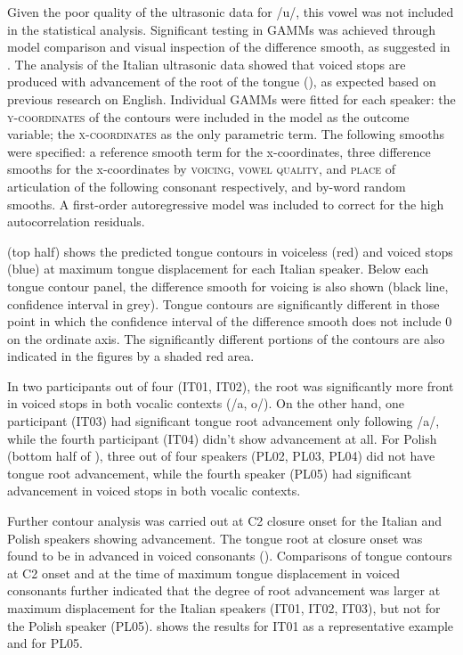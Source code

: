 \documentclass[authoryear, twocolumn]{elsarticle}
\begin{document}
Given the poor quality of the ultrasonic data for /u/, this vowel was
not included in the statistical analysis. Significant testing in GAMMs
was achieved through model comparison and visual inspection of the
difference smooth, as suggested in \citep{soskuthy2017}. The analysis of
the Italian ultrasonic data showed that voiced stops are produced with
advancement of the root of the tongue (), as expected based on previous
research on English. Individual GAMMs were fitted for each speaker: the
\textsc{y-coordinates} of the contours were included in the model as the
outcome variable; the \textsc{x-coordinates} as the only parametric
term. The following smooths were specified: a reference smooth term for
the x-coordinates, three difference smooths for the x-coordinates by
\textsc{voicing}, \textsc{vowel quality}, and \textsc{place} of
articulation of the following consonant respectively, and by-word random
smooths. A first-order autoregressive model was included to correct for
the high autocorrelation residuals.

 (top half) shows the predicted tongue contours in voiceless
(red) and voiced stops (blue) at maximum tongue displacement for each
Italian speaker. Below each tongue contour panel, the difference smooth
for voicing is also shown (black line, confidence interval in grey).
Tongue contours are significantly different in those point in which the
confidence interval of the difference smooth does not include 0 on the
ordinate axis. The significantly different portions of the contours are
also indicated in the figures by a shaded red area.

In two participants out of four (IT01, IT02), the root was significantly
more front in voiced stops in both vocalic contexts (/a, o/). On the
other hand, one participant (IT03) had significant tongue root
advancement only following /a/, while the fourth participant (IT04)
didn't show advancement at all. For Polish (bottom half of
), three out of four speakers (PL02, PL03, PL04) did not
have tongue root advancement, while the fourth speaker (PL05) had
significant advancement in voiced stops in both vocalic contexts.

Further contour analysis was carried out at C2 closure onset for the
Italian and Polish speakers showing advancement. The tongue root at
closure onset was found to be in advanced in voiced consonants ().
Comparisons of tongue contours at C2 onset and at the time of maximum
tongue displacement in voiced consonants further indicated that the
degree of root advancement was larger at maximum displacement for the
Italian speakers (IT01, IT02, IT03), but not for the Polish speaker
(PL05).  shows the results for IT01 as a representative
example and for PL05.
\end{document}
